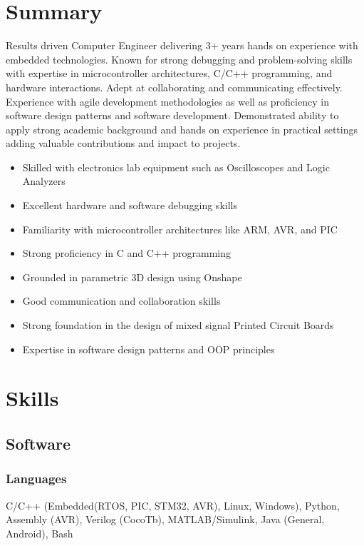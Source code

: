 \documentclass{article}
\begin{document}
\begin{spacing}{.5}

	\section{Summary}
	\hspace*{.8cm}\large{Results driven Computer Engineer delivering 3+ years hands on experience with embedded technologies. Known for strong debugging and problem-solving skills with expertise in microcontroller architectures, C/C++ programming, and hardware interactions. Adept at collaborating and communicating effectively. Experience with agile development methodologies as well as proficiency in software design patterns and software development. Demonstrated ability to apply strong academic background and hands on experience in practical settings adding valuable contributions and impact to projects.}
\begin{center}
\begin{multicols}{2}
		\begin{itemize}[label=$\bullet$,itemsep=-.35ex]
			\item \large{Skilled with electronics lab equipment such as Oscilloscopes and Logic Analyzers}
			\item \large{Excellent hardware and software debugging skills}
			\item \large{Familiarity with microcontroller architectures like ARM, AVR, and PIC}
			\item \large{Strong proficiency in C and C++ programming}
				\columnbreak
			\item \large{Grounded in parametric 3D design using Onshape}
			\item \large{Good communication and collaboration skills}
			\item \large{Strong foundation in the design of mixed signal Printed Circuit Boards}
			\item \large{Expertise in software design patterns and OOP principles}
		\end{itemize}
\end{multicols}
\end{center}
\section{Skills}
	\subsection{Software}
		\subsubsection{Languages} \large{\hspace*{2pt} C/C++} \small{(Embedded(RTOS, PIC, STM32, AVR), Linux, Windows),}\large{ Python, Assembly} \small{(AVR), } \large{Verilog} \small{(CocoTb), } \hspace*{.45cm}\large{MATLAB/Simulink, Java} \small{(General, Android),} \large{ Bash}

\end{spacing}
\end{document}
